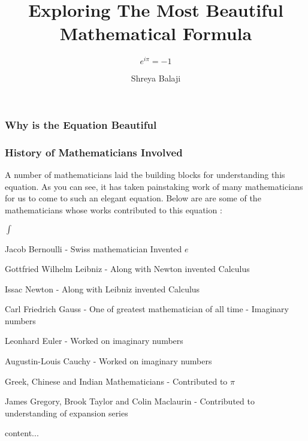 \documentclass[10pt]{beamer}
\begin{document}
\author{Shreya Balaji}
\title{Exploring The Most Beautiful Mathematical Formula}
\subtitle{\huge\(e^{i \pi} = -1\)}
\begin{frame}[plain]
	\maketitle
\end{frame}

\begin{frame}
	\frametitle{Why is the Equation Beautiful}
\end{frame}

\begin{frame}
	\frametitle{ History of Mathematicians Involved}

	A number of mathematicians laid the building blocks for understanding this equation.  As you can see, it has taken painstaking work of many mathematicians for us to come to such an elegant equation. Below are are some of the mathematicians whose works contributed to this equation :
	\vspace{7pt}

	\begin{list}{$\int$}{}
		\item Jacob Bernoulli - Swiss mathematician Invented $e$
		\item  Gottfried Wilhelm Leibniz  - Along with Newton invented Calculus
		\item Issac Newton - Along with Leibniz invented Calculus
		\item Carl Friedrich Gauss - One of  greatest mathematician of all time - Imaginary numbers
		\item Leonhard Euler - Worked on imaginary numbers
		\item Augustin-Louis Cauchy - Worked on imaginary numbers
		\item Greek, Chinese and Indian Mathematicians - Contributed to $\pi$
		\item James Gregory, Brook Taylor and Colin Maclaurin - Contributed to understanding of expansion series

	\end{list}
\end{frame}

\begin{frame}
	content...
\end{frame}
\end{document}
